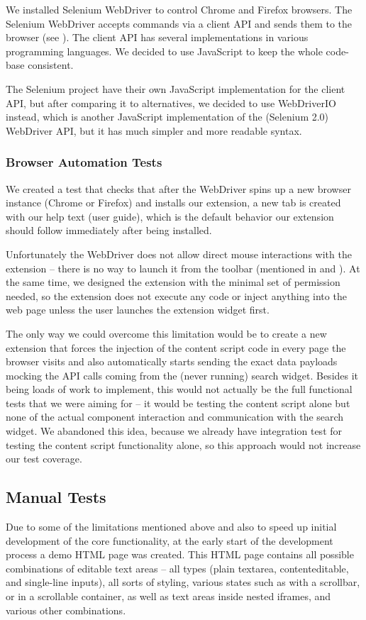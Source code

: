 \documentclass[bsc,frontabs,twoside,singlespacing,parskip,deptreport]{infthesis}
\begin{document}
We installed Selenium WebDriver to control Chrome and Firefox browsers. The Selenium WebDriver accepts commands via a client API and sends them to the browser (see \cite{W2}). The client API has several implementations in various programming languages. We decided to use JavaScript to keep the whole code-base consistent. 

The Selenium project have their own JavaScript implementation for the client API, but after comparing it to alternatives, we decided to use WebDriverIO \cite{A16} instead, which is another JavaScript implementation of the (Selenium 2.0) WebDriver API, but it has much simpler and more readable syntax.

\subsubsection{Browser Automation Tests}
We created a test that checks that after the WebDriver spins up a new browser instance (Chrome or Firefox) and installs our extension, a new tab is created with our help text (user guide), which is the default behavior our extension should follow immediately after being installed.

Unfortunately the WebDriver does not allow direct mouse interactions with the extension -- there is no way to launch it from the toolbar (mentioned in \cite{A17} and \cite{A18}). At the same time, we designed the extension with the minimal set of permission needed, so the extension does not execute any code or inject anything into the web page unless the user launches the extension widget first.

The only way we could overcome this limitation would be to create a new extension that forces the injection of the content script code in every page the browser visits and also automatically starts sending the exact data payloads mocking the API calls coming from the (never running) search widget. Besides it being loads of work to implement, this would not actually be the full functional tests that we were aiming for -- it would be testing the content script alone but none of the actual component interaction and communication with the search widget. We abandoned this idea, because we already have integration test for testing the content script functionality alone, so this approach would not increase our test coverage.

\subsection{Manual Tests}
Due to some of the limitations mentioned above and also to speed up initial development of the core functionality, at the early start of the development process a demo HTML page was created. This HTML page contains all possible combinations of editable text areas -- all types (plain textarea, contenteditable, and single-line inputs), all sorts of styling, various states such as with a scrollbar, or in a scrollable container, as well as text areas inside nested iframes, and various other combinations.
\end{document}
